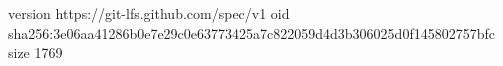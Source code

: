 version https://git-lfs.github.com/spec/v1
oid sha256:3e06aa41286b0e7e29c0e63773425a7c822059d4d3b306025d0f145802757bfc
size 1769
